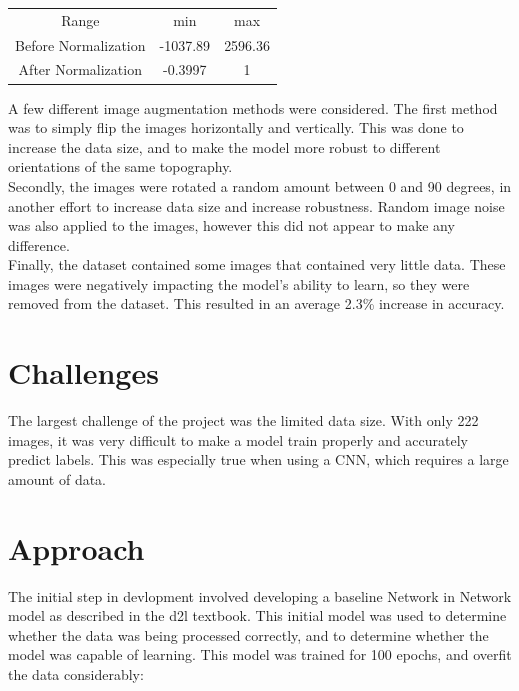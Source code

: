 \documentclass{article}[12pt]
\begin{document}
\begin{center}
    \begin{tabular}{|c|c|c|}
        Range & min & max \\
        Before Normalization & -1037.89 & 2596.36 \\
        After Normalization & -0.3997 & 1 \\
    \end{tabular}
\end{center}

\indent
A few different image augmentation methods were considered. The first method was to simply flip the images horizontally and vertically. This was done to increase the data size, and to make the model more robust to different orientations of the same topography.\\
\indent
Secondly, the images were rotated a random amount between 0 and 90 degrees, in another effort to increase data size and increase robustness. Random image noise was also applied to the images, however this did not appear to make any difference.\\
\indent
Finally, the dataset contained some images that contained very little data. These images were negatively impacting the model's ability to learn, so they were removed from the dataset. This resulted in an average 2.3\% increase in accuracy.\\


\section*{Challenges}

\indent
The largest challenge of the project was the limited data size. With only 222 images, it was very difficult to make a model train properly and accurately predict labels. This was especially true when using a CNN, which requires a large amount of data.\\


\section*{Approach}

\indent
The initial step in devlopment involved developing a baseline Network in Network model as described in the d2l textbook. This initial model was used to determine whether the data was being processed correctly, and to determine whether the model was capable of learning. This model was trained for 100 epochs, and overfit the data considerably: \\
\end{document}
